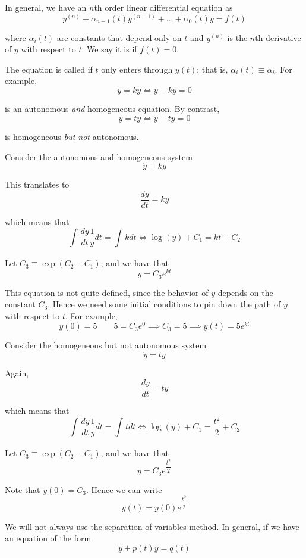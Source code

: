 \documentclass{article}
\begin{document}
In general, we have an $n$th order linear differential equation as
\[
  y^{(n)} + \alpha_{n - 1}(t) y^{(n - 1)} + \ldots + \alpha_0(t) y = f(t)
\]

where $\alpha_{i}(t)$ are constants that depend only on $t$ and $y^{(n)}$ is the $n$th derivative of $y$ with respect to $t$. We say it is  if $f(t) = 0$.

The equation is called  if $t$ only enters through $y(t)$; that is, $\alpha_i(t) \equiv \alpha_i$. For example,
\[
  \dot{y} = k y
  \iff
  \dot{y} - k y = 0
\]

is an autonomous \textit{and} homogeneous equation. By contrast,
\[
  \dot{y} = t y
  \iff
  \dot{y} - t y = 0
\]

is homogeneous \textit{but not} autonomous.  
\begin{example}
  Consider the autonomous and homogeneous system
  \[
    \dot{y} = ky
  \]

  This translates to
  \[
    \dfrac{dy}{dt} = ky
  \]

  which means that
  \[
    \int_{}^{} \dfrac{dy}{dt} \dfrac{1}{y} dt
    =
    \int_{}^{} k dt
    \iff
    \log(y) + C_1 = kt + C_2
  \]

  Let $C_3 \equiv \exp(C_2 - C_1)$, and we have that
  \[
    y = C_3 e^{kt}
  \]

  This equation is not quite defined, since the behavior of $y$ depends on the constant $C_3$. Hence we need some initial conditions to pin down the path of $y$ with respect to $t$. For example,
  \[
    y(0) = 5
    \quad\quad
    5 = C_3 e^{0}
    \implies
    C_3 = 5
    \implies
    y(t) = 5 e^{kt}
  \]
\end{example}

\begin{example}
  Consider the homogeneous but not autonomous system
  \[
    \dot{y} = ty
  \]


  Again,
  \[
    \dfrac{dy}{dt} = ty
  \]

  which means that
  \[
    \int_{}^{} \dfrac{dy}{dt} \dfrac{1}{y} dt
    =
    \int_{}^{} t dt
    \iff
    \log(y) + C_1 = \dfrac{t^2}{2} + C_2
  \]

  Let $C_3 \equiv \exp(C_2 - C_1)$, and we have that
  \[
    y = C_3 e^{\dfrac{t^2}{2}}
  \]

  Note that $y(0) = C_3$. Hence we can write
  \[
    y(t) = y(0) e^{\dfrac{t^2}{2}}
  \]
\end{example}

We will not always use the separation of variables method. In general, if we have an equation of the form
\[
  \dot{y} + p(t) y = q(t)
\]
\end{document}
